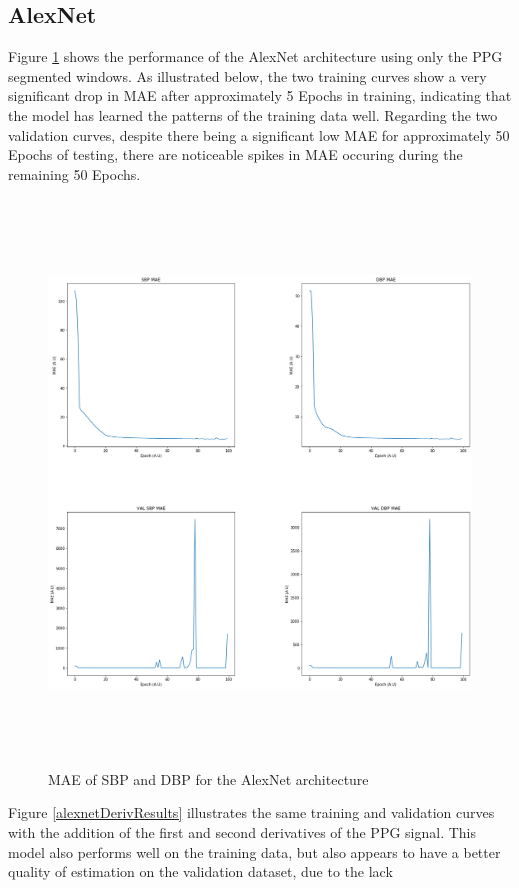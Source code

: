 \subsection{AlexNet}
Figure \ref{alexnetResults} shows the performance of the AlexNet architecture using only the PPG segmented windows. 
As illustrated below, the two training curves show a very significant drop in MAE after approximately 5 Epochs in training, indicating 
that the model has learned the patterns of the training data well. Regarding the two validation curves, despite there being a 
significant low MAE for approximately 50 Epochs of testing, there are noticeable spikes in MAE occuring during the remaining 50 Epochs.
\begin{figure}[H]
    \centering
    \includegraphics[width=15cm,height=15cm,keepaspectratio]{Results/alexnet.png}
    \caption{MAE of SBP and DBP for the AlexNet architecture}
    \label{alexnetResults}
\end{figure}\noindent Figure \ref{alexnetDerivResults} illustrates the same training and validation 
curves with the addition of the first and second derivatives of the PPG signal. This model also performs 
well on the training data, but also appears to have a better quality of estimation on the validation dataset, due to the lack 

